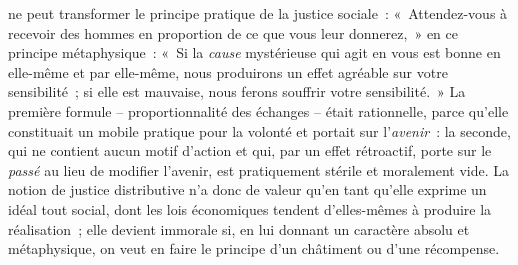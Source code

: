 \documentclass[french,twoside]{book} %
\begin{document}
ne peut transformer le principe pratique de la justice sociale : « Attendez-vous à recevoir des hommes en proportion de ce que vous leur donnerez, » en ce principe métaphysique : « Si la \emph{cause} mystérieuse qui agit en vous est bonne en elle-même et par elle-même, nous produirons un effet agréable sur votre sensibilité ; si elle est mauvaise, nous ferons souffrir votre sensibilité. » La première formule – proportionnalité des échanges – était rationnelle, parce qu’elle constituait un mobile pratique pour la volonté et portait sur l’\emph{avenir} : la seconde, qui ne contient aucun motif d’action et qui, par un effet rétroactif, porte sur le \emph{passé} au lieu de modifier l’avenir, est pratiquement stérile et moralement vide. La notion de justice distributive n’a donc de valeur qu’en tant qu’elle exprime un idéal tout social, dont les lois économiques tendent d’elles-mêmes à produire la réalisation ; elle devient immorale si, en lui donnant un caractère absolu et métaphysique, on veut en faire le principe d’un châtiment ou d’une récompense.\par
\end{document}
